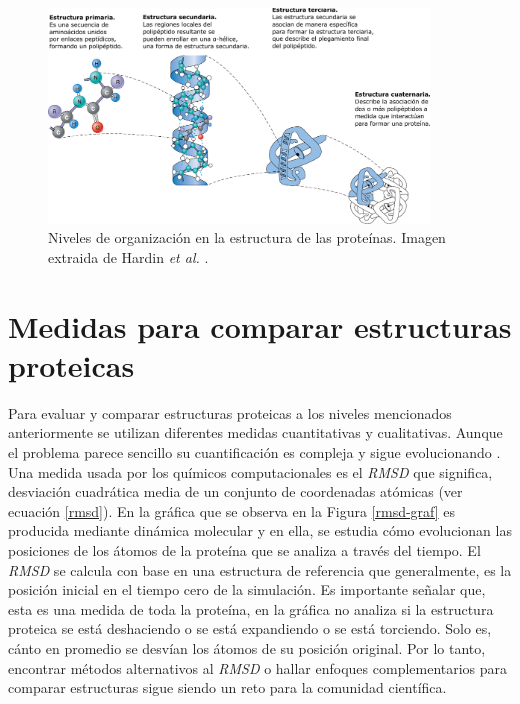 \begin{figure}[h!]
	\centering
	\includegraphics[width=0.9\textwidth]{graphs/niveles.pdf}
	\caption{Niveles de organizaci\'{o}n en la estructura de las prote\'{i}nas. Imagen extraida de Hardin \textit{et al.} \cite{Hardin2022}.}
	\label{fig:nivelesP}
\end{figure}

\section{Medidas para comparar estructuras proteicas}

Para evaluar y comparar estructuras proteicas a los niveles mencionados anteriormente se utilizan diferentes medidas cuantitativas y cualitativas. Aunque el problema parece sencillo su cuantiﬁcaci\'{o}n es compleja y sigue evolucionando \cite{Kufareva2012}. Una medida usada por los qu\'{i}micos computacionales es el \textit{RMSD} que significa, desviación cuadrática media de un conjunto de coordenadas atómicas (ver ecuación \ref{rmsd}). En la gr\'{a}ﬁca que se observa en la Figura \ref{rmsd-graf} es producida mediante dinámica molecular y en ella, se estudia cómo evolucionan las posiciones de los átomos de la proteína que se analiza a través del tiempo. El \textit{RMSD} se calcula con base en una estructura de referencia que generalmente, es la posición inicial en el tiempo cero de la simulación. Es importante señalar que, esta es una medida de toda la proteína, en la gr\'{a}ﬁca no analiza si la estructura proteica se está deshaciendo o se est\'{a} expandiendo o se está torciendo. Solo es, c\'{a}nto en promedio se desvían los \'{a}tomos de su posición original. Por lo tanto, encontrar m\'{e}todos alternativos al \textit{RMSD} o hallar enfoques complementarios para comparar estructuras sigue siendo un reto para la comunidad cient\'{i}ﬁca.


